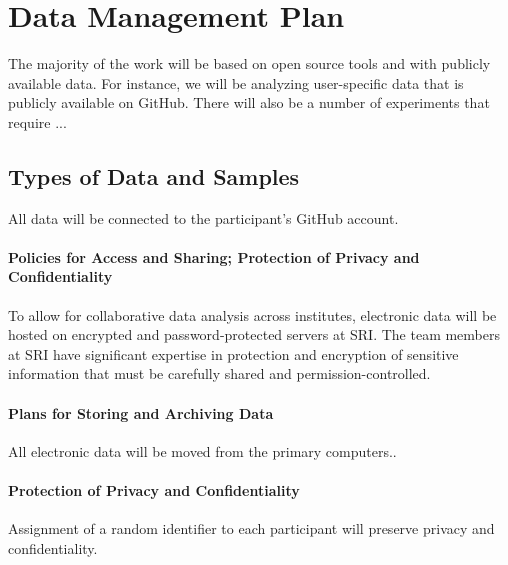 
\section*{Data Management Plan}
The majority of the work will be based on open source tools and with publicly available data.
For instance, we will be analyzing user-specific data that is publicly available on GitHub.
There will also be a number of experiments that require ...


\subsection*{Types of Data and Samples}
All data will be connected to the participant's GitHub account.

\paragraph{Policies for Access and Sharing; Protection of Privacy and Confidentiality}
To allow for collaborative data analysis across institutes, electronic data will be hosted on encrypted and password-protected servers at SRI.
The team members at SRI have significant expertise in protection and encryption of sensitive information that must be carefully shared and permission-controlled.

\paragraph{Plans for Storing and Archiving Data}
All electronic data will be moved from the primary computers..

\paragraph{Protection of Privacy and Confidentiality}
Assignment of a random identifier to each participant will preserve privacy and confidentiality.

